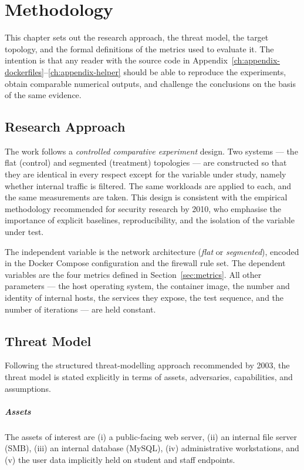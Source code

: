 \chapter{Methodology}
\label{ch:methodology}

This chapter sets out the research approach, the threat model, the target topology, and the formal definitions of the metrics used to evaluate it. The intention is that any reader with the source code in Appendix~\ref{ch:appendix-dockerfiles}--\ref{ch:appendix-helper} should be able to reproduce the experiments, obtain comparable numerical outputs, and challenge the conclusions on the basis of the same evidence.

\section{Research Approach}

The work follows a \emph{controlled comparative experiment} design. Two systems --- the flat (control) and segmented (treatment) topologies --- are constructed so that they are identical in every respect except for the variable under study, namely whether internal traffic is filtered. The same workloads are applied to each, and the same measurements are taken. This design is consistent with the empirical methodology recommended for security research by \textcite{Sommer and Paxson}{2010}, who emphasise the importance of explicit baselines, reproducibility, and the isolation of the variable under test.

The independent variable is the network architecture (\emph{flat} or \emph{segmented}), encoded in the Docker Compose configuration and the firewall rule set. The dependent variables are the four metrics defined in Section~\ref{sec:metrics}. All other parameters --- the host operating system, the container image, the number and identity of internal hosts, the services they expose, the test sequence, and the number of iterations --- are held constant.

\section{Threat Model}
\label{sec:threat-model}

Following the structured threat-modelling approach recommended by \textcite{Howard and LeBlanc}{2003}, the threat model is stated explicitly in terms of assets, adversaries, capabilities, and assumptions.

\paragraph{Assets} The assets of interest are (i) a public-facing web server, (ii) an internal file server (SMB), (iii) an internal database (MySQL), (iv) administrative workstations, and (v) the user data implicitly held on student and staff endpoints.

